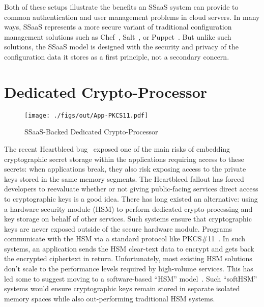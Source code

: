 Both of these setups illustrate the benefits an SSaaS system can
provide to common authentication and user management problems in cloud
servers. In many ways, SSaaS represents a more secure variant of
traditional configuration management solutions such as
Chef~\cite{chef}, Salt~\cite{salt}, or Puppet~\cite{puppet}. But
unlike such solutions, the SSaaS model is designed with the security
and privacy of the configuration data it stores as a first principle,
not a secondary concern.

\section{Dedicated Crypto-Processor}

\begin{figure}[t]
  \centering
  \texttt{[image: ./figs/out/App-PKCS11.pdf]}
  \caption{SSaaS-Backed Dedicated Crypto-Processor}
  \label{fig:app-pkcs11}
\end{figure}

The recent Heartbleed bug~\cite{heartbleed} exposed one of the main
risks of embedding cryptographic secret storage within the
applications requiring access to these secrets: when applications
break, they also risk exposing access to the private keys stored in
the same memory segments. The Heartbleed fallout has forced developers
to reevaluate whether or not giving public-facing services direct
access to cryptographic keys is a good idea. There has long existed an
alternative: using a hardware security module (HSM) to perform
dedicated crypto-processing and key storage on behalf of other
services. Such systems ensure that cryptographic keys are never
exposed outside of the secure hardware module. Programs communicate
with the HSM via a standard protocol like
PKCS\#11~\cite{pcks11-standard}. In such systems, an application sends
the HSM clear-text data to encrypt and gets back the encrypted
ciphertext in return. Unfortunately, most existing HSM solutions don't
scale to the performance levels required by high-volume services. This
has led some to suggest moving to a software-based ``HSM''
model~\cite{lorier-pkcs11}. Such ``softHSM'' systems would ensure
cryptographic keys remain stored in separate isolated memory spaces
while also out-performing traditional HSM systems.

